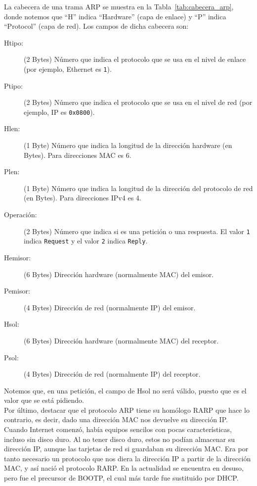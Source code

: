 La cabecera de una trama \acrshort{ARP} se muestra en la Tabla~\ref{tab:cabecera_arp}, donde notemos que ``H'' indica ``Hardware'' (capa de enlace) y ``P'' indica ``Protocol'' (capa de red). Los campos de dicha cabecera son:
\begin{description}
    \item[Htipo:] (2 Bytes) Número que indica el protocolo que se usa en el nivel de enlace (por ejemplo, Ethernet es \verb|1|).
    \item[Ptipo:] (2 Bytes) Número que indica el protocolo que se usa en el nivel de red (por ejemplo, \acrshort{IP} es \verb|0x0800|).
    \item[Hlen:] (1 Byte) Número que indica la longitud de la dirección hardware (en Bytes). Para direcciones \acrshort{MAC} es 6.
    \item[Plen:] (1 Byte) Número que indica la longitud de la dirección del protocolo de red (en Bytes). Para direcciones \acrshort{IPv4} es 4.
    \item[Operación:] (2 Bytes) Número que indica si es una petición o una respuesta. El valor \verb|1| indica \verb|Request| y el valor \verb|2| indica \verb|Reply|.
    \item[Hemisor:] (6 Bytes) Dirección hardware (normalmente MAC) del emisor.
    \item[Pemisor:] (4 Bytes) Dirección de red (normalmente IP) del emisor.
    \item[Hsol:] (6 Bytes) Dirección hardware (normalmente MAC) del receptor.
    \item[Psol:] (4 Bytes) Dirección de red (normalmente IP) del receptor.
\end{description}

Notemos que, en una petición, el campo de Hsol no será válido, puesto que es el valor que se está pidiendo.\\

Por último, destacar que el protocolo \acrshort{ARP} tiene su homólogo \acrfull{RARP} que hace lo contrario, es decir, dado una dirección \acrshort{MAC} nos devuelve su dirección IP\@. Cuando Internet comenzó, había equipos sencilos con pocas características, incluso sin disco duro. Al no tener disco duro, estos no podían almacenar su dirección IP, aunque las tarjetas de red si guardaban su dirección \acrshort{MAC}. Era por tanto necesario un protocolo que nos diera la dirección IP a partir de la dirección \acrshort{MAC}, y así nació el protocolo \acrshort{RARP}. En la actualidad se encuentra en desuso, pero fue el precursor de \acrshort{BOOTP}, el cual más tarde fue sustituido por \acrshort{DHCP}.

